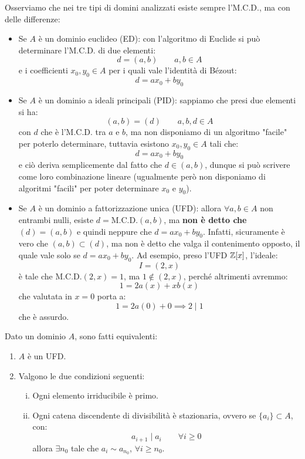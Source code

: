\documentclass[11pt]{scrartcl}
\begin{document}
\begin{remark}
    Osserviamo che nei tre tipi di domini analizzati esiste sempre l'M.C.D., ma con delle differenze:
    \begin{itemize}
        \item Se $A$ è un dominio euclideo (ED): con l'algoritmo di Euclide si può determinare l'M.C.D. di due elementi:
        \[ d = (a,b) \qquad a,b \in A
            \]
        e i coefficienti $x_0,y_0 \in A$ per i quali vale l'identità di Bézout:
        \[ d = ax_0 + by_0
            \]
        \item Se $A$ è un dominio a ideali principali (PID): sappiamo che presi due elementi si ha:
        \[ (a,b) = (d) \qquad a,b,d \in A
            \]
        con $d$ che è l'M.C.D. tra $a$ e $b$, ma non disponiamo di un algoritmo "facile" per poterlo determinare, tuttavia esistono $x_0, y_0 \in A$ tali che:
        \[ d = ax_0 + by_0
            \]
        e ciò deriva semplicemente dal fatto che $d \in (a,b)$, dunque si può scrivere come loro combinazione lineare (ugualmente però non disponiamo di algoritmi "facili" per poter determinare $x_0$ e $y_0$).
        \item Se $A$ è un dominio a fattorizzazione unica (UFD): allora $\forall a,b \in A$ non entrambi nulli, esiste $d = \text{M.C.D.}(a,b)$, ma \textbf{non è detto che} $(d) = (a,b)$ e quindi neppure che $d = ax_0 + by_0$.
        Infatti, sicuramente è vero che $(a,b) \subset (d)$, ma non è detto che valga il contenimento opposto, il quale vale solo se $d = ax_0 + by_0$. Ad esempio, preso l'UFD $\mathbb Z[x]$, l'ideale:
        \[ I = (2,x)
            \]
        è tale che $\text{M.C.D.}(2,x) = 1$, ma $1 \not \in (2,x)$, perché altrimenti avremmo:
        \[ 1 = 2a(x) + xb(x)
            \]
        che valutata in $x = 0$ porta a:
        \[ 1 = 2a(0) + 0 \implies 2 \mid 1
            \]
        che è assurdo.
    \end{itemize}
\end{remark}

\begin{theorem}
    \label{2.101}
    Dato un dominio $A$, sono fatti equivalenti:
    \begin{enumerate}[(1)]
        \item $A$ è un UFD.
        \item Valgono le due condizioni seguenti:
        \begin{enumerate}[(i)]
            \item Ogni elemento irriducibile è primo.
            \item Ogni catena discendente di divisibilità è stazionaria, ovvero se $\{a_i\} \subset A$, con:
            \[ a_{i+1} \mid a_i \qquad \forall i \geq 0
                \]
            allora $\exists n_0$ tale che $a_i \sim a_{n_0}$, $\forall i \geq n_0$.
        \end{enumerate}
    \end{enumerate}
\end{theorem}
\end{document}
